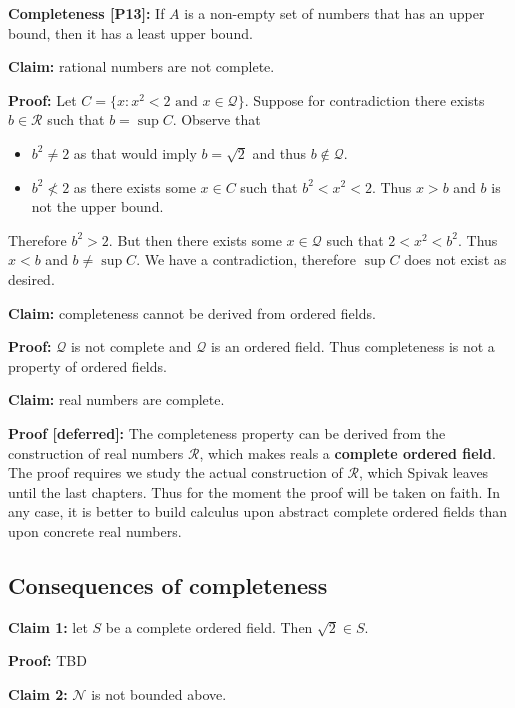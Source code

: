 \vs

\textbf{Completeness [P13]:} If $A$ is a non-empty set of numbers that
has an upper bound, then it has a least upper bound.

\vs

\textbf{Claim:} rational numbers are not complete.

\textbf{Proof:} Let $C=\{x:x^{2}<2\text{ and }x\in\mathcal{Q}\}$. Suppose for
contradiction there exists $b\in\mathcal{R}$ such that $b=\sup C$. Observe that
\begin{itemize}
\item $b^{2}\neq2$ as that would imply $b=\sqrt{2}$ and thus $b\notin\mathcal{Q}$.
\item $b^{2}\not<2$ as there exists some $x\in C$ such that
  $b^{2}<x^{2}<2$. Thus $x>b$ and $b$ is not the upper bound.
\end{itemize}

Therefore $b^{2}>2$. But then there exists some $x\in\mathcal{Q}$ such that
$2<x^{2}<b^{2}$. Thus $x<b$ and $b\neq\sup C$. We have a contradiction,
therefore $\sup C$ does not exist as desired.

\vs

\textbf{Claim:} completeness cannot be derived from ordered fields.

\textbf{Proof:} $\mathcal{Q}$ is not complete and $\mathcal{Q}$ is an ordered field. Thus
completeness is not a property of ordered fields.

\vs

\textbf{Claim:} real numbers are complete.

\textbf{Proof [deferred]:} The completeness property can be derived
from the construction of real numbers $\mathcal{R}$, which makes reals a
\textbf{complete ordered field}. The proof requires we study the
actual construction of $\mathcal{R}$, which Spivak leaves until the last
chapters. Thus for the moment the proof will be taken on faith. In any
case, it is better to build calculus upon abstract complete ordered
fields than upon concrete real numbers.

\subsection{Consequences of completeness}
\textbf{Claim 1:} let $S$ be a complete ordered field. Then $\sqrt{2}\in
S$.

\textbf{Proof:} TBD

\vs

\textbf{Claim 2:} $\mathcal{N}$ is not bounded above.

